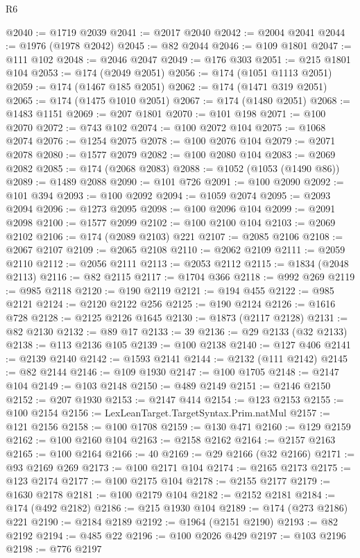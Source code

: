 \begin{lexlean}{R6}
\begin{coremodule}
@2040 := @1719 @2039
@2041 := @2017 @2040
@2042 := @2004 @2041
@2044 := @1976 (@1978 @2042)
@2045 := @82 @2044
@2046 := @109 @1801
@2047 := @111 @102
@2048 := @2046 @2047
@2049 := @176 @303
@2051 := @215 @1801 @104
@2053 := @174 (@2049 @2051)
@2056 := @174 (@1051 @1113 @2051)
@2059 := @174 (@1467 @185 @2051)
@2062 := @174 (@1471 @319 @2051)
@2065 := @174 (@1475 @1010 @2051)
@2067 := @174 (@1480 @2051)
@2068 := @1483 @1151
@2069 := @207 @1801
@2070 := @101 @198
@2071 := @100 @2070
@2072 := @743 @102
@2074 := @100 @2072 @104
@2075 := @1068 @2074
@2076 := @1254 @2075
@2078 := @100 @2076 @104
@2079 := @2071 @2078
@2080 := @1577 @2079
@2082 := @100 @2080 @104
@2083 := @2069 @2082
@2085 := @174 (@2068 @2083)
@2088 := @1052 (@1053 (@1490 @86))
@2089 := @1489 @2088
@2090 := @101 @726
@2091 := @100 @2090
@2092 := @101 @394
@2093 := @100 @2092
@2094 := @1059 @2074
@2095 := @2093 @2094
@2096 := @1273 @2095
@2098 := @100 @2096 @104
@2099 := @2091 @2098
@2100 := @1577 @2099
@2102 := @100 @2100 @104
@2103 := @2069 @2102
@2106 := @174 (@2089 @2103) @221
@2107 := @2085 @2106
@2108 := @2067 @2107
@2109 := @2065 @2108
@2110 := @2062 @2109
@2111 := @2059 @2110
@2112 := @2056 @2111
@2113 := @2053 @2112
@2115 := @1834 (@2048 @2113)
@2116 := @82 @2115
@2117 := @1704 @366
@2118 := @992 @269
@2119 := @985 @2118
@2120 := @190 @2119
@2121 := @194 @455
@2122 := @985 @2121
@2124 := @2120 @2122 @256
@2125 := @190 @2124
@2126 := @1616 @728
@2128 := @2125 @2126 @1645
@2130 := @1873 (@2117 @2128)
@2131 := @82 @2130
@2132 := @89 @17
@2133 := 39
@2136 := @29 @2133 (@32 @2133)
@2138 := @113 @2136 @105
@2139 := @100 @2138
@2140 := @127 @406
@2141 := @2139 @2140
@2142 := @1593 @2141
@2144 := @2132 (@111 @2142)
@2145 := @82 @2144
@2146 := @109 @1930
@2147 := @100 @1705
@2148 := @2147 @104
@2149 := @103 @2148
@2150 := @489 @2149
@2151 := @2146 @2150
@2152 := @207 @1930
@2153 := @2147 @414
@2154 := @123 @2153
@2155 := @100 @2154
@2156 := LexLeanTarget.TargetSyntax.Prim.natMul
@2157 := @121 @2156
@2158 := @100 @1708
@2159 := @130 @471
@2160 := @129 @2159
@2162 := @100 @2160 @104
@2163 := @2158 @2162
@2164 := @2157 @2163
@2165 := @100 @2164
@2166 := 40
@2169 := @29 @2166 (@32 @2166)
@2171 := @93 @2169 @269
@2173 := @100 @2171 @104
@2174 := @2165 @2173
@2175 := @123 @2174
@2177 := @100 @2175 @104
@2178 := @2155 @2177
@2179 := @1630 @2178
@2181 := @100 @2179 @104
@2182 := @2152 @2181
@2184 := @174 (@492 @2182)
@2186 := @215 @1930 @104
@2189 := @174 (@273 @2186) @221
@2190 := @2184 @2189
@2192 := @1964 (@2151 @2190)
@2193 := @82 @2192
@2194 := @485 @22
@2196 := @100 @2026 @429
@2197 := @103 @2196
@2198 := @776 @2197

\end{coremodule}
\end{lexlean}
